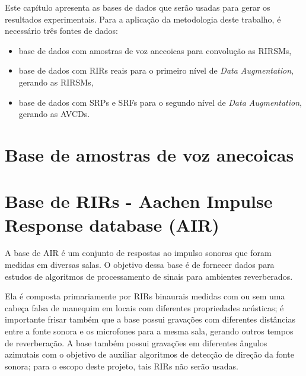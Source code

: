 Este capítulo apresenta as bases de dados que serão usadas para gerar os resultados experimentais.
Para a aplicação da metodologia deste trabalho, é necessário três fontes de dados:

\begin{itemize}
    \item base de dados com amostras de voz anecoicas para convolução as RIRSMs,
    \item base de dados com RIRs reais para o primeiro nível de \textit{Data Augmentation}, gerando as RIRSMs,
    \item base de dados com SRPs e SRFs para o segundo nível de \textit{Data Augmentation}, gerando as AVCDs.
\end{itemize}


\section{Base de amostras de voz anecoicas}

\section{Base de RIRs - Aachen Impulse Response database (AIR)}

A base de AIR \cite{AIR_Database} é um conjunto de respostas ao impulso sonoras que foram medidas em diversas salas.
O objetivo dessa base é de fornecer dados para estudos de algoritmos de processamento de sinais para ambientes reverberados.

Ela é composta primariamente por RIRs binaurais medidas com ou sem uma cabeça falsa de manequim em locais com diferentes
propriedades acústicas; é importante frisar também que a base possui gravações com diferentes distâncias entre a fonte sonora
e os microfones para a mesma sala, gerando outros tempos de reverberação.
A base também possui gravações em diferentes ângulos azimutais com o objetivo de auxiliar algoritmos de detecção
de direção da fonte sonora; para o escopo deste projeto, tais RIRs não serão usadas.

